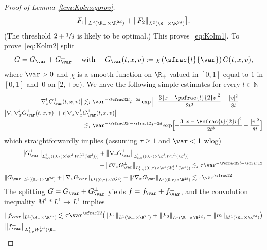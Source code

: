 \begin{proof}[Proof of Lemma~\ref{lem:Kolmogorov}]
\begin{multline*}
F_1 \|_{L^2(\R_- \times \R^{2d})} + \left\| F_2
\right\|_{L^2(\R_- \times \R^{2d})} \bigr].
\end{multline*}
(The threshold $2+\sfrac1d$ is likely to be optimal.) This
proves~\eqref{eq:Kolm1}. To prove~\eqref{eq:Kolm2} split
\begin{align*}
G = G_\var + G_\var^\bot \quad \text{ with } \quad
G_\var(t,x,v) := \chi \left( \sfrac{t}{\var} \right) G(t,x,v),
\end{align*}
where $\var >0$ and $\chi$ is a smooth function on $\R_+$
valued in $[0,1]$ equal to $1$ in $[0,1]$ and~$0$ on
$[2,+\infty)$.
\Changel
We have the following simple estimates for every
$l \in \mathbb{N}$
\begin{align*}
\left|\nabla_x^l G_\var^\bot(t,x,v)\right| &\lesssim_l
\var^{-\Psfrac32 l}t^{-2d}
\exp \Bigl[ - \frac{3 \left| x - \psfrac{t}{2} v
\right|^2}{2t^3} - \frac{|v|^2}{8t} \Bigr] \\
 \left|\nabla_v \nabla_x^l G_\var^\bot(t,x,v)\right|
+ t\bigl|\nabla_x \nabla_x^l &G_\var^\bot(t,x,v) \bigr|
\\[-3pt]
&\lesssim_l \var^{-\Psfrac32 l -\sfrac12} t^{-2d}
\exp \Bigl[ - \frac{3 \left| x - \Psfrac{t}{2} v
\right|^2}{2t^3} - \frac{|v|^2}{8t} \Bigr]
\end{align*}
which straightforwardly implies (assuming $\tau \ge 1$ and
$\var <1$ wlog)
\begin{align*}
\left\| G_\var^\bot \right\|_{L^1_{t,v}((0,\tau)
\times \R^d; W^{l,1}_x(\R^d)))} +
\left\| \nabla_v G_\var^\bot \right\|_{L^1_{t,v}((0,\tau)
\times \R^d ; W^{l,1}_x(\R^d))}\hspace*{1mm}& \\
+ \left\|t\nabla_x G_\var^\bot \right\|_{L^1_{t,v}((0,\tau)
\times \R^d ; W^{l,1}_x(\R^d))}
&\lesssim_l \tau \var^{-\Psfrac32 l -\sfrac12} \\
\| G_\var \|_{L^1((0,\tau) \times \R^{2d})} + \left\|
\nabla_v G_\var \right\|_{L^1((0,\tau) \times \R^{2d})}
+ \left\|t\nabla_x G_\var \right\|_{L^1((0,\tau) \times \R^{2d})}
&\lesssim \tau \var^{\sfrac12}.
\end{align*}
The splitting $G=G_\var + G_\var^\bot$ yields
$f = f_\var + f_\var^\bot$, and the convolution inequality
$M^1 * L^1 \to L^1$ implies
\begin{align*}
& \| f_\var \|_{L^1(\R_- \times \R^{2d})} \lesssim
\tau \var^{\sfrac12} \bigl( \| F_1 \|_{L^1(\R_- \times \R^{2d})} +
\left\| F_2 \right\|_{L^1(\R_- \times \R^{2d})}
+ \| m \|_{M^1(\R_- \times
\R^{2d})} \bigr) \\
& \bigl\| f_\var^\bot \bigr\|_{L^1_{t,v}W^{l,1}_x(\R_-
}
\end{align*}
\end{proof}
